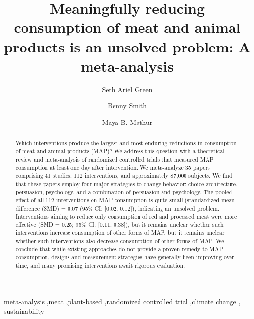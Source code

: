 \documentclass[preprint, 3p,
authoryear]{elsarticle} %
\begin{document}
\begin{frontmatter}

  \title{Meaningfully reducing consumption of meat and animal products
is an unsolved problem: A meta-analysis}
    \author[1]{Seth Ariel Green%
  }
    \author[2]{Benny Smith%
  }
  
    \author[1]{Maya B. Mathur%
  }
  
  \begin{abstract}
  Which interventions produce the largest and most enduring reductions
  in consumption of meat and animal products (MAP)? We address this
  question with a theoretical review and meta-analysis of randomized
  controlled trials that measured MAP consumption at least one day after
  intervention. We meta-analyze 35 papers comprising 41 studies, 112
  interventions, and approximately 87,000 subjects. We find that these
  papers employ four major strategies to change behavior: choice
  architecture, persuasion, psychology, and a combination of persuasion
  and psychology. The pooled effect of all 112 interventions on MAP
  consumption is quite small (standardized mean difference (SMD) = 0.07
  (95\% CI: {[}0.02, 0.12{]}), indicating an unsolved problem.
  Interventions aiming to reduce only consumption of red and processed
  meat were more effective (SMD = 0.25; 95\% CI: {[}0.11, 0.38{]}), but
  it remains unclear whether such interventions increase consumption of
  other forms of MAP. but it remains unclear whether such interventions
  also decrease consumption of other forms of MAP. We conclude that
  while existing approaches do not provide a proven remedy to MAP
  consumption, designs and measurement strategies have generally been
  improving over time, and many promising interventions await rigorous
  evaluation.
  \end{abstract}
    \begin{keyword}
    meta-analysis \sep meat \sep plant-based \sep randomized controlled
trial \sep climate change \sep 
    sustainability
  \end{keyword}
  
 \end{frontmatter}
\end{document}
